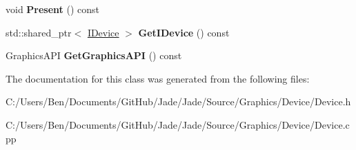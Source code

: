 \begin{DoxyCompactItemize}
\item 
\hypertarget{class_jade_1_1_graphics_1_1_device_a037cd57e0e544caf0aaa793162cd23b3}{}void {\bfseries Present} () const \label{class_jade_1_1_graphics_1_1_device_a037cd57e0e544caf0aaa793162cd23b3}

\item 
\hypertarget{class_jade_1_1_graphics_1_1_device_a635de94382dbe1b6072d34bbc3222616}{}std\+::shared\+\_\+ptr$<$ \hyperlink{struct_jade_1_1_graphics_1_1_i_device}{I\+Device} $>$ {\bfseries Get\+I\+Device} () const \label{class_jade_1_1_graphics_1_1_device_a635de94382dbe1b6072d34bbc3222616}

\item 
\hypertarget{class_jade_1_1_graphics_1_1_device_add64b3329cc1039e842f4b9f67b7110d}{}Graphics\+A\+P\+I {\bfseries Get\+Graphics\+A\+P\+I} () const \label{class_jade_1_1_graphics_1_1_device_add64b3329cc1039e842f4b9f67b7110d}

\end{DoxyCompactItemize}


The documentation for this class was generated from the following files\+:\begin{DoxyCompactItemize}
\item 
C\+:/\+Users/\+Ben/\+Documents/\+Git\+Hub/\+Jade/\+Jade/\+Source/\+Graphics/\+Device/Device.\+h\item 
C\+:/\+Users/\+Ben/\+Documents/\+Git\+Hub/\+Jade/\+Jade/\+Source/\+Graphics/\+Device/Device.\+cpp\end{DoxyCompactItemize}
